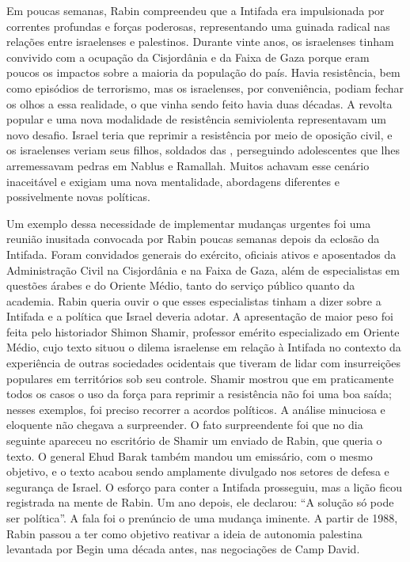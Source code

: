 Em poucas semanas, Rabin compreendeu que a Intifada era impulsionada por
correntes profundas e forças poderosas, representando uma guinada
radical nas relações entre israelenses e palestinos. Durante vinte anos,
os israelenses tinham convivido com a ocupação da Cisjordânia e da Faixa
de Gaza porque eram poucos os impactos sobre a maioria da população do
país. Havia resistência, bem como episódios de terrorismo, mas os
israelenses, por conveniência, podiam fechar os olhos a essa realidade,
o que vinha sendo feito havia duas décadas. A revolta popular e uma nova
modalidade de resistência semiviolenta representavam um novo desafio.
Israel teria que reprimir a resistência por meio de oposição civil, e os
israelenses veriam seus filhos, soldados das , perseguindo
adolescentes que lhes arremessavam pedras em Nablus e Ramallah. Muitos
achavam esse cenário inaceitável e exigiam uma nova mentalidade,
abordagens diferentes e possivelmente novas políticas.

Um exemplo dessa necessidade de implementar mudanças urgentes foi uma
reunião inusitada convocada por Rabin poucas semanas depois da eclosão
da Intifada. Foram convidados generais do exército, oficiais ativos e
aposentados da Administração Civil na Cisjordânia e na Faixa de Gaza,
além de especialistas em questões árabes e do Oriente Médio, tanto do
serviço público quanto da academia. Rabin queria ouvir o que esses
especialistas tinham a dizer sobre a Intifada e a política que Israel
deveria adotar. A apresentação de maior peso foi feita pelo historiador
Shimon Shamir, professor emérito especializado em Oriente Médio, cujo
texto situou o dilema israelense em relação à Intifada no contexto da
experiência de outras sociedades ocidentais que tiveram de lidar com
insurreições populares em territórios sob seu controle. Shamir mostrou
que em praticamente todos os casos o uso da força para reprimir a
resistência não foi uma boa saída; nesses exemplos, foi preciso recorrer
a acordos políticos. A análise minuciosa e eloquente não chegava a
surpreender. O fato surpreendente foi que no dia seguinte apareceu no
escritório de Shamir um enviado de Rabin, que queria o texto. O general
Ehud Barak também mandou um emissário, com o mesmo objetivo, e o texto
acabou sendo amplamente divulgado nos setores de defesa e segurança de
Israel. O esforço para conter a Intifada prosseguiu, mas a lição ficou
registrada na mente de Rabin. Um ano depois, ele declarou: ``A solução
só pode ser política''. A fala foi o prenúncio de uma mudança iminente.
A partir de 1988, Rabin passou a ter como objetivo reativar a ideia de
autonomia palestina levantada por Begin uma década antes, nas
negociações de Camp David.


